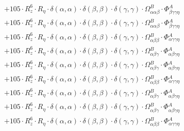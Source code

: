 \documentclass{article}
\begin{document}
\begin{subequations}
\begin{gather}
\begin{array}{c}
 \\[0.2em] 		 + 105 \cdot R_{z}^{6} \cdot R_{\eta{}} \cdot \delta{}\left(\alpha{}, \alpha{}\right) \cdot \delta{}\left(\beta{}, \beta{}\right) \cdot \delta{}\left(\gamma{}, \gamma{}\right) \cdot \Omega{}^{B}_{\alpha{}\alpha{}\beta{}} \cdot \Phi{}^{A}_{\beta{}\gamma{}\gamma{}\eta{}} 
 \\[0.2em] 		 + 105 \cdot R_{z}^{6} \cdot R_{\eta{}} \cdot \delta{}\left(\alpha{}, \alpha{}\right) \cdot \delta{}\left(\beta{}, \beta{}\right) \cdot \delta{}\left(\gamma{}, \gamma{}\right) \cdot \Omega{}^{B}_{\alpha{}\alpha{}\beta{}} \cdot \Phi{}^{A}_{\beta{}\gamma{}\gamma{}\eta{}} 
 \\[0.2em] 		 + 105 \cdot R_{z}^{6} \cdot R_{\eta{}} \cdot \delta{}\left(\alpha{}, \alpha{}\right) \cdot \delta{}\left(\beta{}, \beta{}\right) \cdot \delta{}\left(\gamma{}, \gamma{}\right) \cdot \Omega{}^{B}_{\alpha{}\beta{}\beta{}} \cdot \Phi{}^{A}_{\alpha{}\gamma{}\gamma{}\eta{}} 
 \\[0.2em] 		 + 105 \cdot R_{z}^{6} \cdot R_{\eta{}} \cdot \delta{}\left(\alpha{}, \alpha{}\right) \cdot \delta{}\left(\beta{}, \beta{}\right) \cdot \delta{}\left(\gamma{}, \gamma{}\right) \cdot \Omega{}^{B}_{\alpha{}\beta{}\gamma{}} \cdot \Phi{}^{A}_{\alpha{}\beta{}\gamma{}\eta{}} 
 \\[0.2em] 		 + 105 \cdot R_{z}^{6} \cdot R_{\eta{}} \cdot \delta{}\left(\alpha{}, \alpha{}\right) \cdot \delta{}\left(\beta{}, \beta{}\right) \cdot \delta{}\left(\gamma{}, \gamma{}\right) \cdot \Omega{}^{B}_{\alpha{}\beta{}\gamma{}} \cdot \Phi{}^{A}_{\alpha{}\beta{}\gamma{}\eta{}} 
 \\[0.2em] 		 + 105 \cdot R_{z}^{6} \cdot R_{\eta{}} \cdot \delta{}\left(\alpha{}, \alpha{}\right) \cdot \delta{}\left(\beta{}, \beta{}\right) \cdot \delta{}\left(\gamma{}, \gamma{}\right) \cdot \Omega{}^{B}_{\alpha{}\beta{}\beta{}} \cdot \Phi{}^{A}_{\alpha{}\gamma{}\gamma{}\eta{}} 
 \\[0.2em] 		 + 105 \cdot R_{z}^{6} \cdot R_{\eta{}} \cdot \delta{}\left(\alpha{}, \alpha{}\right) \cdot \delta{}\left(\beta{}, \beta{}\right) \cdot \delta{}\left(\gamma{}, \gamma{}\right) \cdot \Omega{}^{B}_{\alpha{}\beta{}\gamma{}} \cdot \Phi{}^{A}_{\alpha{}\beta{}\gamma{}\eta{}} 
 \\[0.2em] 		 + 105 \cdot R_{z}^{6} \cdot R_{\eta{}} \cdot \delta{}\left(\alpha{}, \alpha{}\right) \cdot \delta{}\left(\beta{}, \beta{}\right) \cdot \delta{}\left(\gamma{}, \gamma{}\right) \cdot \Omega{}^{B}_{\alpha{}\beta{}\gamma{}} \cdot \Phi{}^{A}_{\alpha{}\beta{}\gamma{}\eta{}} 
 \\[0.2em] 		 + 105 \cdot R_{z}^{6} \cdot R_{\eta{}} \cdot \delta{}\left(\alpha{}, \alpha{}\right) \cdot \delta{}\left(\beta{}, \beta{}\right) \cdot \delta{}\left(\gamma{}, \gamma{}\right) \cdot \Omega{}^{B}_{\alpha{}\beta{}\beta{}} \cdot \Phi{}^{A}_{\alpha{}\gamma{}\gamma{}\eta{}} 

\end{array}
\end{gather}
\end{subequations}
\end{document}
